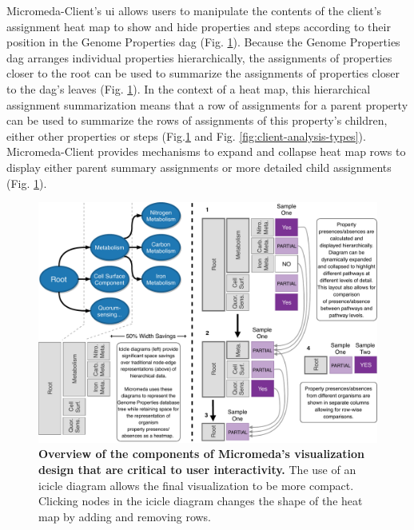 Micromeda-Client's \gls{ui} allows users to manipulate the contents of the 
client's assignment heat map to show and hide properties and steps according to 
their position in the Genome Properties \gls{dag} \cite{richardson2018genome} 
(Fig. \ref{fig:visualization-philosophy}). Because the Genome Properties 
\gls{dag} arranges individual properties hierarchically, the assignments of 
properties closer to the root can be used to summarize the assignments of 
properties closer to the \gls{dag}'s leaves (Fig. 
\ref{fig:visualization-philosophy}). In the context of a heat map, this 
hierarchical assignment summarization means that a row of assignments for a 
parent property can be used to summarize the rows of assignments of this 
property's children, either other properties or steps 
(Fig.\ref{fig:visualization-philosophy} and Fig. 
\ref{fig:client-analysis-types}). Micromeda-Client provides mechanisms to expand 
and collapse heat map rows to display either parent summary assignments or more 
detailed child assignments (Fig. \ref{fig:visualization-philosophy}).

\begin{figure}[!ht]
  \centering
	\includegraphics[width=\textwidth]{media/visualization_design_philosphy.pdf}
	 \caption[Overview of the components of Micromeda's visualization design that 
are critical to user interactivity.]{\textbf{Overview of the components of 
Micromeda's visualization design that are critical to user interactivity.} The 
use of an icicle diagram allows the final visualization to be more compact. 
Clicking nodes in the icicle diagram changes the shape of the heat map by adding 
and removing rows.}
	 \label{fig:visualization-philosophy}
\end{figure}

